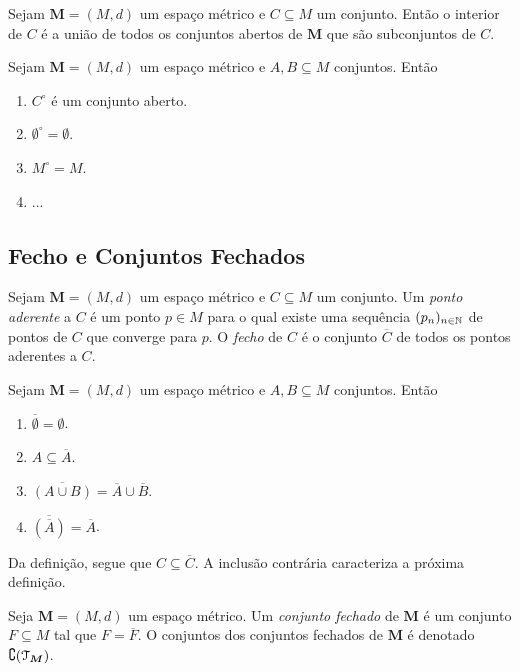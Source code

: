 \begin{prop}
	Sejam $\bm M = (M,d)$ um espaço métrico e $C \subseteq M$ um conjunto. Então o interior de $C$ é a união de todos os conjuntos abertos de $\bm M$ que são subconjuntos de $C$.
\end{prop}

\begin{prop}
	Sejam $\bm M = (M,d)$ um espaço métrico e $A,B \subseteq M$ conjuntos. Então
	\begin{enumerate}
	\item $C^\circ$ é um conjunto aberto.
	\item $\emptyset^\circ = \emptyset$.
	\item $M^\circ = M$.
	\item ...
	\end{enumerate}
\end{prop}

\subsection{Fecho e Conjuntos Fechados}

\begin{defi}
	Sejam $\bm M = (M,d)$ um espaço métrico e $C \subseteq M$ um conjunto. Um \emph{ponto aderente} a $C$ é um ponto $p \in M$ para o qual existe uma sequência $(p_n)_{n \in \mathbb{N}}$ de pontos de $C$ que converge para $p$. O \emph{fecho} de $C$ é o conjunto $\overline C$ de todos os pontos aderentes a $C$.
\end{defi}

\begin{prop}
	Sejam $\bm M = (M,d)$ um espaço métrico e $A,B \subseteq M$ conjuntos. Então
	\begin{enumerate}
	\item $\overline \emptyset = \emptyset$.
	\item $A \subseteq \overline A$.
	\item $\overline{(A \cup B)} = \overline A \cup \overline B$.
	\item $\overline{(\overline A)} = \overline A$.
	\end{enumerate}
\end{prop}

Da definição, segue que $C \subseteq \overline C$. A inclusão contrária caracteriza a próxima definição.

\begin{defi}
	Seja $\bm M = (M,d)$ um espaço métrico. Um \emph{conjunto fechado} de $\bm M$ é um conjunto $F \subseteq M$ tal que $F = \overline F$. O conjuntos dos conjuntos fechados de $\bm M$ é denotado $\complement( \mathcal{T}_{\bm M})$.
\end{defi}

